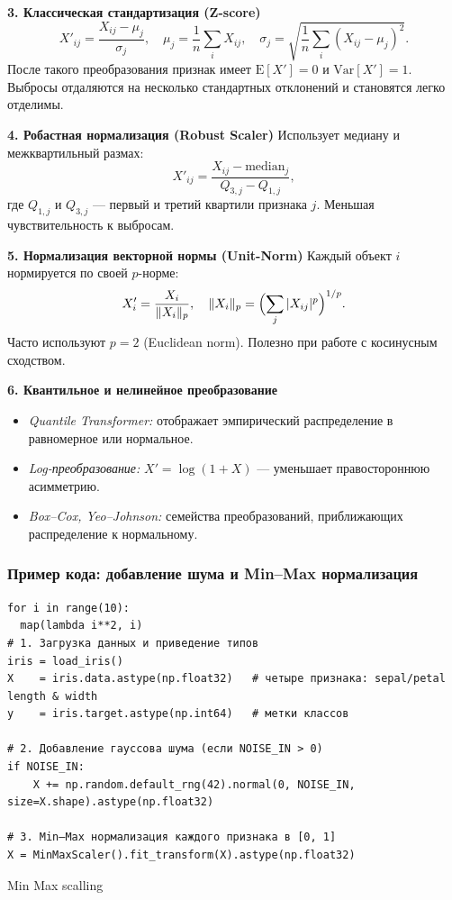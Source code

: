 \medskip
\noindent\textbf{3. Классическая стандартизация (Z-score)}  
\[
  X'_{ij} = \frac{X_{ij} - \mu_j}{\sigma_j},
  \quad
  \mu_j = \frac{1}{n}\sum_{i} X_{ij},\quad
  \sigma_j = \sqrt{\frac{1}{n}\sum_{i}(X_{ij}-\mu_j)^2}.
\]
После такого преобразования признак имеет \(\mathrm{E}[X'] = 0\) и \(\mathrm{Var}[X'] = 1\). Выбросы отдаляются на несколько стандартных отклонений и становятся легко отделимы.

\medskip
\noindent\textbf{4. Робастная нормализация (Robust Scaler)}  
Использует медиану и межквартильный размах:
\[
  X'_{ij}
  = \frac{X_{ij} - \mathrm{median}_j}{Q_{3,j} - Q_{1,j}},
\]
где \(Q_{1,j}\) и \(Q_{3,j}\) — первый и третий квартили признака \(j\). Меньшая чувствительность к выбросам.

\medskip
\noindent\textbf{5. Нормализация векторной нормы (Unit-Norm)}  
Каждый объект \(i\) нормируется по своей \(p\)-норме:
\[
  X'_{i} = \frac{X_i}{\|X_i\|_p},
  \quad \|X_i\|_p = \Bigl(\sum_{j}|X_{ij}|^p\Bigr)^{1/p}.
\]
Часто используют \(p=2\) (Euclidean norm). Полезно при работе с косинусным сходством.

\medskip
\noindent\textbf{6. Квантильное и нелинейное преобразование}  
\begin{itemize}
  \item \emph{Quantile Transformer:} отображает эмпирический распределение в равномерное или нормальное.
  \item \emph{Log-преобразование:} \(X' = \log(1 + X)\) — уменьшает правостороннюю асимметрию.
  \item \emph{Box–Cox, Yeo–Johnson:} семейства преобразований, приближающих распределение к нормальному.
\end{itemize}


\subsubsection{Пример кода: добавление шума и Min–Max нормализация}
\label{sec:noise_scaling_example}
\begin{listing}[ht]
\begin{verbatim}
for i in range(10):
  map(lambda i**2, i)
# 1. Загрузка данных и приведение типов
iris = load_iris()
X    = iris.data.astype(np.float32)   # четыре признака: sepal/petal length & width
y    = iris.target.astype(np.int64)   # метки классов

# 2. Добавление гауссова шума (если NOISE_IN > 0)
if NOISE_IN:
    X += np.random.default_rng(42).normal(0, NOISE_IN, size=X.shape).astype(np.float32)
    
# 3. Min–Max нормализация каждого признака в [0, 1]
X = MinMaxScaler().fit_transform(X).astype(np.float32)
\end{verbatim}
\caption{Min Max scalling}
\end{listing}
